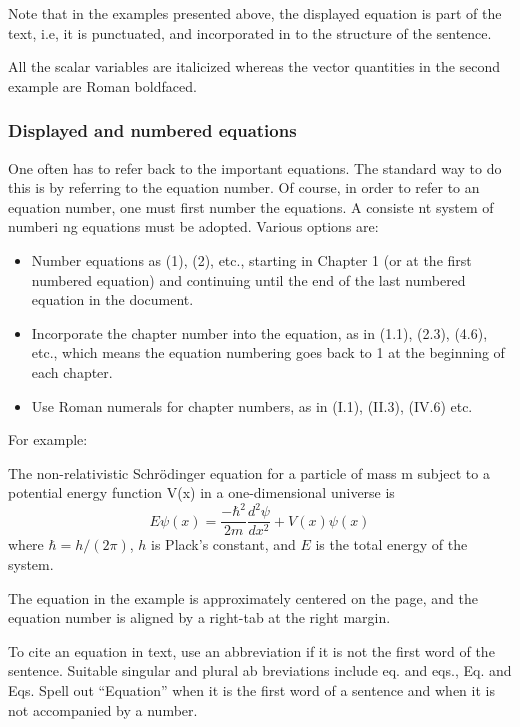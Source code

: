 Note that in the examples presented above, the displayed equation is part of the text, i.e, it is punctuated, and incorporated in to the structure of the sentence.

All the scalar variables are italicized whereas the vector quantities in the second example are Roman boldfaced.

\subsubsection{Displayed and numbered equations}
\label{sec:dineq}

One often has to refer back to the important equations. The standard way to do this is by referring to the equation number. Of course, in order to refer to an equation number, one must first number the equations. A consiste nt system of numberi ng equations must be adopted. Various options are:
\begin{itemize}
\item Number equations as (1), (2), etc., starting in Chapter 1 (or at the first numbered equation) and continuing until the end of the last numbered equation in the document.
\item Incorporate the chapter number into the equation, as in (1.1),  (2.3), (4.6), etc., which means the equation numbering goes back to 1 at the beginning of each chapter.
\item Use Roman numerals for chapter numbers, as in (I.1), (II.3), (IV.6) etc.
\end{itemize}

For example:

\begin{IMleftrightskip}
The non-relativistic Schrödinger equation for a particle of mass m
subject to a potential energy function V(x) in a one-dimensional universe is
%
\begin{equation}
  \label{eq:1}
  E \psi(x) = \frac{-\hbar^2}{2m} \frac{d^2\psi}{d x^2} + V(x)\psi(x)
\end{equation}
%
where $\hbar = h/(2\pi)$, $h$ is Plack’s constant, and $E$ is the total energy of the system.
\end{IMleftrightskip}

The equation in the example is approximately centered on the page, and the equation number is aligned by a right-tab at the right margin.

To cite an equation in text, use an abbreviation if it is not the first word of the sentence. Suitable singular and plural ab breviations include eq. and eqs., Eq. and Eqs. Spell out “Equation” when it is the first word of a sentence and when it is not accompanied by a number.

